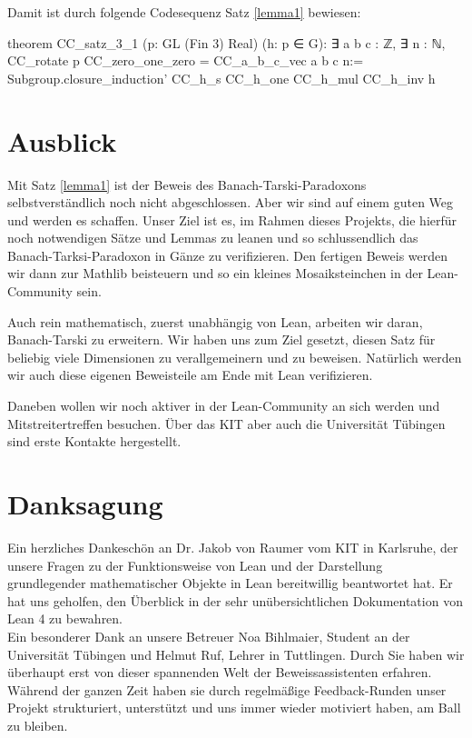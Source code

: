 \documentclass[10pt]{article}
\begin{document}
\noindent Damit ist durch folgende Codesequenz Satz \ref{lemma1} bewiesen:
\begin{leancode}
theorem CC_satz_3_1 (p: GL (Fin 3) Real) (h: p ∈ G):
       ∃ a b c : ℤ, ∃ n : ℕ, CC_rotate p CC_zero_one_zero = CC_a_b_c_vec a b c n:=
  Subgroup.closure_induction' CC_h_s CC_h_one CC_h_mul CC_h_inv h
\end{leancode}


\section{Ausblick}
Mit Satz \ref{lemma1} ist der Beweis des Banach-Tarski-Paradoxons selbstverständlich noch nicht abgeschlossen. Aber wir sind auf einem guten Weg und werden es schaffen. Unser Ziel ist es, im Rahmen dieses Projekts, die hierfür noch notwendigen Sätze und Lemmas zu leanen und so schlussendlich das Banach-Tarksi-Paradoxon in Gänze zu verifizieren. Den fertigen Beweis werden wir dann zur Mathlib beisteuern und so ein kleines Mosaiksteinchen in der Lean-Community sein. 

\noindent Auch rein mathematisch, zuerst unabhängig von Lean, arbeiten wir daran, Banach-Tarski zu erweitern. Wir haben uns zum Ziel gesetzt, diesen Satz für beliebig viele Dimensionen zu verallgemeinern und zu beweisen. Natürlich werden wir auch diese eigenen Beweisteile am Ende mit Lean verifizieren.

\noindent Daneben wollen wir noch aktiver in der Lean-Community an sich werden und Mitstreitertreffen besuchen. Über das KIT aber auch die Universität Tübingen sind erste Kontakte hergestellt.    

\newpage
\section{Danksagung}
Ein herzliches Dankeschön an Dr. Jakob von Raumer vom KIT in Karlsruhe, der unsere Fragen zu der Funktionsweise von Lean und der Darstellung grundlegender mathematischer Objekte in Lean bereitwillig beantwortet hat. Er hat uns geholfen, den Überblick in der sehr unübersichtlichen Dokumentation von Lean 4 zu bewahren. \\

\noindent Ein besonderer Dank an unsere Betreuer Noa Bihlmaier, Student an der Universität Tübingen und Helmut Ruf, Lehrer in Tuttlingen. Durch Sie haben wir überhaupt erst von dieser spannenden Welt der Beweissassistenten erfahren. Während der ganzen Zeit haben sie durch regelmäßige Feedback-Runden unser Projekt strukturiert, unterstützt und uns immer wieder motiviert haben, am Ball zu bleiben. \\
\end{document}
